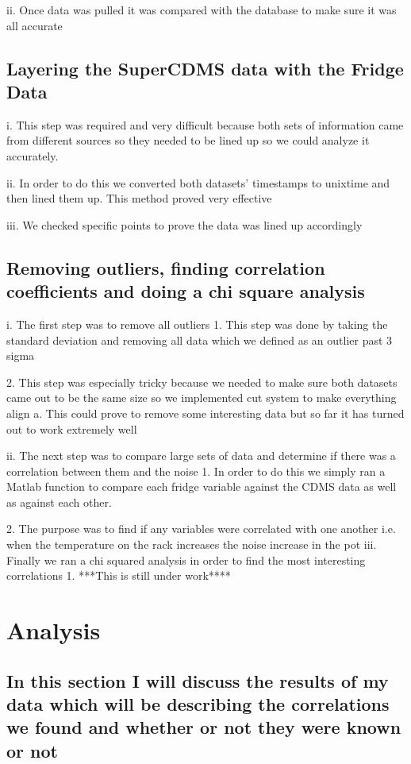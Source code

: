 ii.	Once data was pulled it was compared with the database to make sure it was all accurate

\subsection{Layering the SuperCDMS data with the Fridge Data}
i.	This step was required and very difficult because both sets of information came from different sources so they needed to be lined up so we could analyze it accurately. 

ii.	In order to do this we converted both datasets’ timestamps to unixtime and then lined them up. This method proved very effective

iii.	We checked specific points to prove the data was lined up accordingly

\subsection{Removing outliers, finding correlation coefficients and doing a chi square analysis}
i.	The first step was to remove all outliers
1.	This step was done by taking the standard deviation and removing all data which we defined as an outlier past 3 sigma

2.	This step was especially tricky because we needed to make sure both datasets came out to be the same size so we implemented cut system to make everything align
a.	This could prove to remove some interesting data but so far it has turned out to work extremely well

ii.	The next step was to compare large sets of data and determine if there was a correlation between them and the noise
1.	In order to do this we simply ran a Matlab function to compare each fridge variable against the CDMS data as well as against each other.

2.	The purpose was to find if any variables were correlated with one another i.e. when the temperature on the rack increases the noise increase in the pot
iii.	Finally we ran a chi squared analysis in order to find the most interesting correlations
1.	***This is still under work****
\section{Analysis}
\subsection{In this section I will discuss the results of my data which will be describing the correlations we found and whether or not they were known or not}
